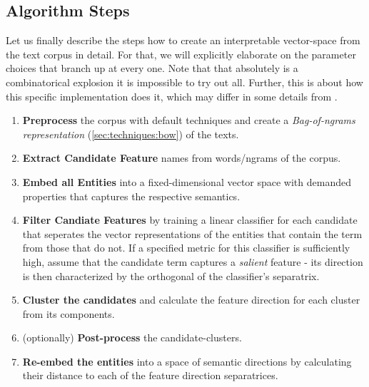 \subsection{Algorithm Steps}
\label{sec:algorithm_steps}


Let us finally describe the steps how to create an interpretable vector-space from the text corpus in detail. For that, we will explicitly elaborate on the parameter choices that branch up at every one. Note that that absolutely is a combinatorical explosion it is impossible to try out all. Further, this is about how this specific implementation does it, which may differ in some details from \mainalgos.

\label{sec:algorithmsteps}
\begin{enumerate}
	\item[\saveref{sec:algo_preproc}{1.}] \textbf{Preprocess} the corpus with default techniques and create a \textit{Bag-of-ngrams representation} (\ref{sec:techniques:bow}) of the texts.
	\item[\saveref{sec:extract_cands}{2.}] \textbf{Extract Candidate Feature} names from words/\glspl{ngram} of the corpus.
	\item[\saveref{sec:generate_vectorspaces}{3.}] \textbf{Embed all Entities} into a fixed-dimensional vector space with demanded properties that captures the respective semantics.
	\item[\saveref{sec:svm_filter_cands}{4.}] \textbf{Filter Candiate Features} by training a linear classifier for each candidate that seperates the vector representations of the entities that contain the term from those that do not. If a specified metric for this classifier is sufficiently high, assume that the candidate term captures a \textit{salient} feature - its direction is then characterized by the orthogonal of the classifier's separatrix.
	\item[\saveref{sec:generate_vectorspaces}{5.}] \textbf{Cluster the candidates} and calculate the feature direction for each cluster from its components.
	\item[\saveref{sec:generate_vectorspaces}{6.}] (optionally) \textbf{Post-process} the candidate-clusters.
	\item[\saveref{sec:generate_vectorspaces}{7.}] \textbf{Re-embed the entities} into a space of semantic directions by calculating their distance to each of the feature direction separatrices.	
\end{enumerate}

